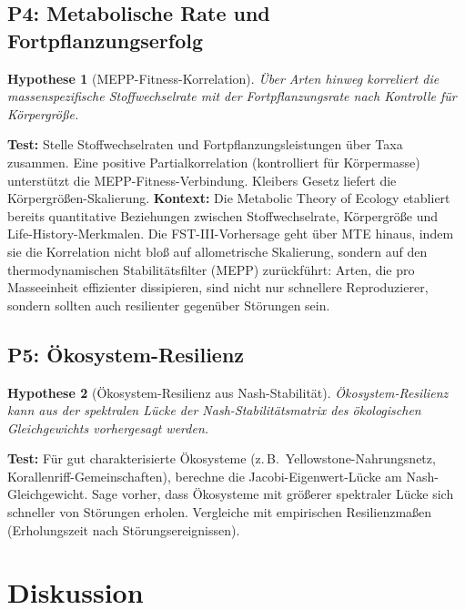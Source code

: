 \documentclass[12pt,a4paper]{article}
\newtheorem{hypothesis}{Hypothese}
\theoremstyle{remark}
\begin{document}
\subsection{P4: Metabolische Rate und Fortpflanzungserfolg}

\begin{hypothesis}[MEPP-Fitness-Korrelation]
\"Uber Arten hinweg korreliert die massenspezifische Stoffwechselrate mit der Fortpflanzungsrate nach Kontrolle f\"ur K\"orpergr\"o\ss{}e.
\end{hypothesis}

\textbf{Test:} Stelle Stoffwechselraten und Fortpflanzungsleistungen \"uber Taxa zusammen. Eine positive Partialkorrelation (kontrolliert f\"ur K\"orpermasse) unterst\"utzt die MEPP-Fitness-Verbindung. Kleibers Gesetz liefert die K\"orpergr\"o\ss{}en-Skalierung. \textbf{Kontext:} Die Metabolic Theory of Ecology \citep{BrownMTE2004} etabliert bereits quantitative Beziehungen zwischen Stoffwechselrate, K\"orpergr\"o\ss{}e und Life-History-Merkmalen. Die FST-III-Vorhersage geht \"uber MTE hinaus, indem sie die Korrelation nicht blo\ss{} auf allometrische Skalierung, sondern auf den thermodynamischen Stabilit\"atsfilter (MEPP) zur\"uckf\"uhrt: Arten, die pro Masseeinheit effizienter dissipieren, sind nicht nur schnellere Reproduzierer, sondern sollten auch resilienter gegen\"uber St\"orungen sein.

\subsection{P5: \"Okosystem-Resilienz}

\begin{hypothesis}[\"Okosystem-Resilienz aus Nash-Stabilit\"at]
\"Okosystem-Resilienz kann aus der spektralen L\"ucke der Nash-Stabilit\"atsmatrix des \"okologischen Gleichgewichts vorhergesagt werden.
\end{hypothesis}

\textbf{Test:} F\"ur gut charakterisierte \"Okosysteme (z.\,B.\ Yellowstone-Nahrungsnetz, Korallenriff-Gemeinschaften), berechne die Jacobi-Eigenwert-L\"ucke am Nash-Gleichgewicht. Sage vorher, dass \"Okosysteme mit gr\"o\ss{}erer spektraler L\"ucke sich schneller von St\"orungen erholen. Vergleiche mit empirischen Resilienzma\ss{}en (Erholungszeit nach St\"orungsereignissen).

\section{Diskussion}
\label{sec:discussion}
\end{document}
